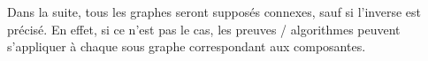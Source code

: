 

Dans la suite, tous les graphes seront suppos\'es connexes, sauf si l'inverse est
pr\'ecis\'e.
En effet, si ce n'est pas le cas, les preuves / algorithmes peuvent
s'appliquer \`a chaque sous graphe correspondant aux composantes.

